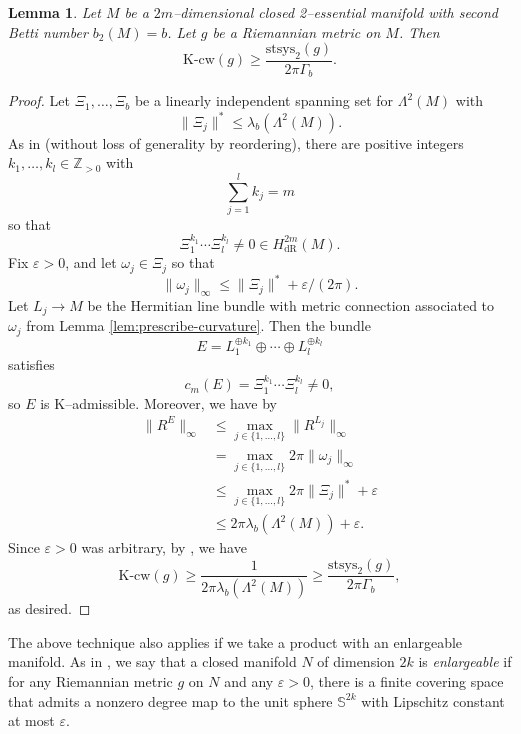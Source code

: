 \documentclass[12pt]{amsart}
\newtheorem{lemma}[theorem]{Lemma}
\theoremstyle{definition}
\numberwithin{equation}{section}
\newcommand{\Z}{\mathbb{Z}}
\newcommand{\eps}{\varepsilon}
\newcommand{\kcw}{\mathrm{K}\text{-}\mathrm{cw}}
\begin{document}
\begin{lemma}\label{lem:cw-gen}
Let $M$ be a $2m$--dimensional closed 2--essential manifold with second Betti number $b_2(M) = b$. Let $g$ be a Riemannian metric on $M$. Then
\[ \kcw(g) \geq \frac{\mathrm{stsys}_2(g)}{2\pi \Gamma_b}. \]
\end{lemma}
\begin{proof}
Let $\Xi_1, \hdots, \Xi_b$ be a linearly independent spanning set for $\Lambda^2(M)$ with
\[ \|\Xi_j\|^* \leq \lambda_b(\Lambda^2(M)). \]
As in \cite[Proof of Theorem 3.3]{GHK:systole} (without loss of generality by reordering), there are positive integers $k_1, \hdots, k_l \in \Z_{>0}$ with
\[ \sum_{j=1}^l k_j = m \]
so that
\[ \Xi_1^{k_1} \cdots \Xi_l^{k_l} \neq 0 \in H^{2m}_{\mathrm{dR}}(M). \]
Fix $\eps > 0$, and let $\omega_j \in \Xi_j$ so that
\[ \|\omega_j\|_{\infty} \leq \|\Xi_j\|^* + \eps/(2\pi). \]
Let $L_j \to M$ be the Hermitian line bundle with metric connection associated to $\omega_j$ from Lemma \ref{lem:prescribe-curvature}. Then the bundle
\[ E = L_1^{\oplus k_1} \oplus \cdots \oplus L_l^{\oplus k_l} \]
satisfies
\[ c_m(E) = \Xi_1^{k_1}\cdots \Xi_l^{k_l} \neq 0, \]
so $E$ is $\mathrm{K}$--admissible. Moreover, we have by \cite[\S4, Page 18]{Gromov:K-area}
\begin{align*}
\|R^E\|_{\infty}
& \leq \max_{j \in \{1, \hdots, l\}} \|R^{L_j}\|_{\infty}\\
& = \max_{j \in \{1, \hdots, l\}} 2\pi\|\omega_j\|_{\infty}\\
& \leq \max_{j \in \{1, \hdots, l\}} 2\pi\|\Xi_j\|^* + \eps\\
& \leq 2\pi \lambda_b(\Lambda^2(M)) + \eps.
\end{align*}
Since $\eps > 0$ was arbitrary, by \cite[\S2]{GHK:systole}, we have
\[ \kcw(g) \geq \frac{1}{2\pi \lambda_b(\Lambda^2(M))} \geq \frac{\mathrm{stsys}_2(g)}{2\pi \Gamma_b}, \]
as desired.
\end{proof}

The above technique also applies if we take a product with an enlargeable manifold. As in \cite{Gromov-Lawson:closed}, we say that a closed manifold $N$ of dimension $2k$ is \emph{enlargeable} if for any Riemannian metric $g$ on $N$ and any $\eps > 0$, there is a finite covering space that admits a nonzero degree map to the unit sphere $\mathbb{S}^{2k}$ with Lipschitz constant at most $\eps$.
\end{document}
